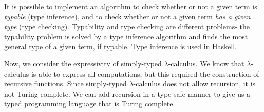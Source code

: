 \documentclass[a4paper, openany]{memoir}
\theoremstyle{definition}
\begin{document}
    It is possible to implement an algorithm to check whether or not a given term is \emph{typable} (type inference), and to check whether or not a given term \emph{has a given type} (type checking). Typability and type checking are different problems- the typability problem is solved by a type inference algorithm and finds the most general type of a given term, if typable. Type inference is used in Haskell.

    Now, we consider the expressivity of simply-typed $\lambda$-calculus. We know that $\lambda$-calculus is able to express all computations, but this required the construction of recursive functions. Since simply-typed $\lambda$-calculus does not allow recursion, it is not Turing complete. We can add recursion in a type-safe manner to give us a typed programming language that is Turing complete.

    
\end{document}
